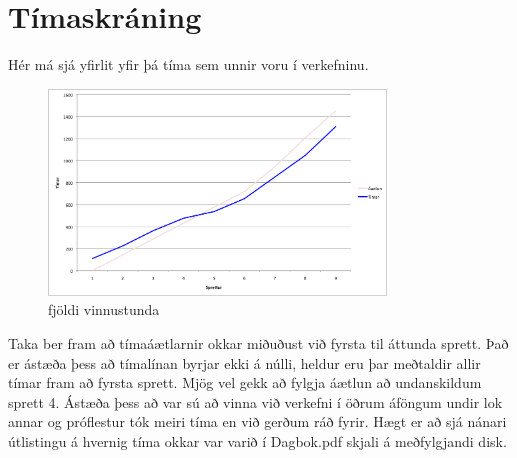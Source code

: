 \documentclass{article}
\begin{document}
\newpage
\section{Tímaskráning}
Hér má sjá yfirlit yfir þá tíma sem unnir voru í verkefninu. 

\begin{figure}[H]
  \centering
  \includegraphics[width=0.8\textwidth]{fjoldi_vinnustunda.png} 
  \caption{fjöldi vinnustunda} 
\end{figure}

Taka ber fram að tímaáætlarnir okkar miðuðust við fyrsta til áttunda sprett. Það er ástæða þess að tímalínan 
byrjar ekki á núlli, heldur eru þar meðtaldir allir tímar fram að fyrsta sprett.
Mjög vel gekk að fylgja áætlun að undanskildum sprett 4. Ástæða þess að var sú að 
vinna við verkefni í öðrum áföngum undir lok annar og próflestur tók meiri tíma en við gerðum ráð fyrir.
Hægt er að sjá nánari útlistingu á hvernig tíma okkar var varið í Dagbok.pdf skjali á meðfylgjandi disk.
\end{document}
